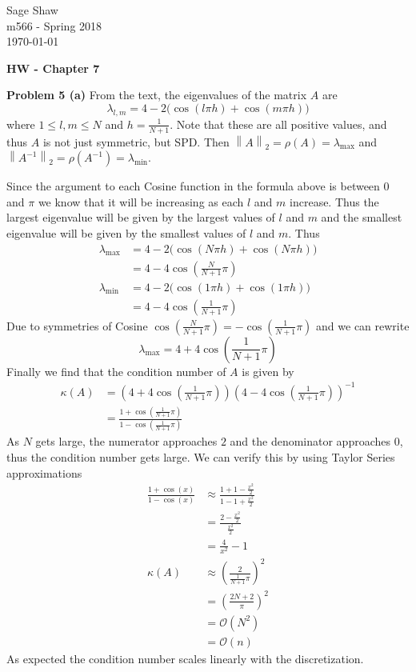 \documentclass[12pt]{article}
\newcommand{\problem}[1]{\hspace{-4 ex} \large \textbf{Problem #1} }
\newcommand{\norm}[1]{\left\lVert#1\right\rVert}
\begin{document}
	\thispagestyle{empty}
	
	\begin{flushright}
		Sage Shaw \\
		m566 - Spring 2018 \\
		\today
	\end{flushright}
	
{\large \textbf{HW - Chapter 7}}\bigbreak

\problem{5 (a)} From the text, the eigenvalues of the matrix $A$ are 
$$\lambda_{l,m} = 4 - 2 \big( \cos(l \pi h) + \cos(m \pi h) \big)$$
where $1 \leq l,m \leq N$ and $h = \frac{1}{N+1}$. Note that these are all positive values, and thus $A$ is not just symmetric, but SPD. Then $\norm{A}_2 = \rho(A) = \lambda_{\text{max}}$ and $\norm{A^{-1}}_2 = \rho(A^{-1}) = \lambda_{\text{min}}$. \break

Since the argument to each Cosine function in the formula above is between $0$ and $\pi$ we know that it will be increasing as each $l$ and $m$ increase. Thus the largest eigenvalue will be given by the largest values of $l$ and $m$ and the smallest eigenvalue will be given by the smallest values of $l$ and $m$. Thus 
\begin{align*}
	\lambda_\text{max} & = 4 - 2 \big( \cos(N \pi h) + \cos(N \pi h) \big) \\
	& = 4 - 4 \cos\left(\frac{N }{N+1}\pi \right) \\
	\lambda_\text{min} & = 4 - 2 \big( \cos(1 \pi h) + \cos(1 \pi h) \big) \\
	& = 4 - 4 \cos\left(\frac{1 }{N+1}\pi \right)
\end{align*}
Due to symmetries of Cosine $\cos\left(\frac{N }{N+1}\pi \right) = -\cos\left(\frac{1 }{N+1}\pi \right)$ and we can rewrite
$$
\lambda_\text{max} = 4 + 4 \cos\left(\frac{1 }{N+1}\pi \right)
$$
Finally we find that the condition number of $A$ is given by
\begin{align*}
	\kappa(A) & = \left( 4 + 4 \cos\left(\frac{1 }{N+1}\pi \right) \right) 
		\left( 4 - 4 \cos\left(\frac{1 }{N+1}\pi \right) \right)^{-1} \\
	& = \frac{1 + \cos\left(\frac{1 }{N+1}\pi \right)}{ 1 - \cos\left(\frac{1 }{N+1}\pi \right)}
\end{align*}
As $N$ gets large, the numerator approaches $2$ and the denominator approaches $0$, thus the condition number gets large. We can verify this by using Taylor Series approximations
\begin{align*}
	\frac{1 + \cos(x)}{ 1 - \cos(x)} & \approx \frac{1 + 1 - \frac{x^2}{2}}{1 - 1 + \frac{x^2}{2}} \\
	& = \frac{2 - \frac{x^2}{2}}{\frac{x^2}{2}} \\
	& = \frac{4}{x^2} - 1 \\
	\kappa(A) & \approx \left( \frac{2}{\frac{1}{N+1}\pi} \right)^2 \\
	& = \left( \frac{2N + 2}{\pi} \right)^2 \\
	& = \mathcal{O}(N^2) \\
	& = \mathcal{O}(n)
\end{align*}
As expected the condition number scales linearly with the discretization.
\end{document}
